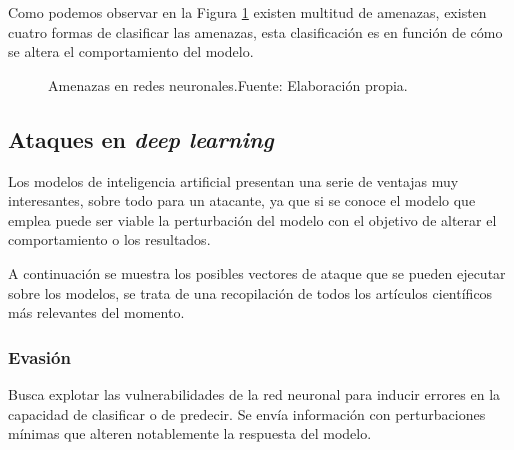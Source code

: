 Como podemos observar en la Figura \ref{fig:art-adversarial-threats} existen multitud de amenazas, existen cuatro formas de clasificar las amenazas, esta clasificación es en función de cómo se altera el comportamiento del modelo.

\begin{figure}[H]
    \centering
    \centerline{}
    \caption{Amenazas en redes neuronales.\newline{}Fuente: Elaboración propia.}
    \label{fig:art-adversarial-threats}
\end{figure}



\subsection{Ataques en \textit{deep learning}}

Los modelos de inteligencia artificial presentan una serie de ventajas muy interesantes, sobre todo para un atacante, ya que si se conoce el modelo que emplea puede ser viable la perturbación del modelo con el objetivo de alterar el comportamiento o los resultados.

A continuación se muestra los posibles vectores de ataque que se pueden ejecutar sobre los modelos, se trata de una recopilación de todos los artículos científicos más relevantes del momento.
 


\subsubsection{Evasión}
Busca explotar las vulnerabilidades de la red neuronal para inducir errores en la capacidad de clasificar o de predecir. Se envía información con perturbaciones mínimas que alteren notablemente la respuesta del modelo.

